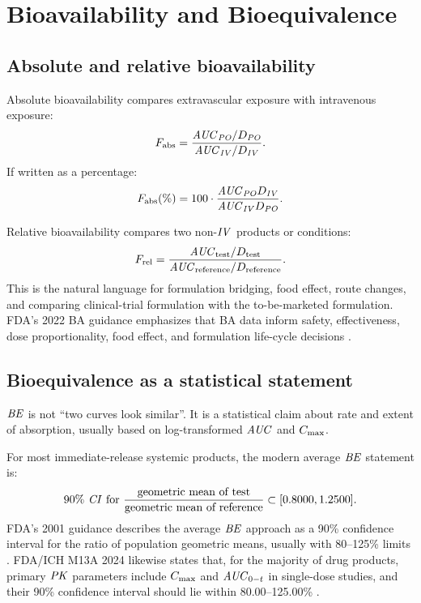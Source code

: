 \documentclass[a4paper]{article}
\newcommand{\AUC}{\ensuremath{\pksym{AUC}}}
\newcommand{\Cmax}{\ensuremath{C_{\pklab{max}}}}
\newcommand{\PK}{\ensuremath{\pksym{PK}}}
\newcommand{\BE}{\ensuremath{\pksym{BE}}}
\newcommand{\IV}{\ensuremath{\pksym{IV}}}
\newcommand{\PO}{\ensuremath{\pksym{PO}}}
\newcommand{\CI}{\ensuremath{\pksym{CI}}}
\begin{document}
\section{Bioavailability and Bioequivalence}

\subsection{Absolute and relative bioavailability}

Absolute bioavailability compares extravascular exposure with intravenous exposure:
\[
  F_{\pklab{abs}}
  =
  \frac{\AUC_{\PO}/D_{\PO}}{\AUC_{\IV}/D_{\IV}}.
\]
If written as a percentage:
\[
  F_{\pklab{abs}}(\%)
  =
  100\cdot
  \frac{\AUC_{\PO}D_{\IV}}{\AUC_{\IV}D_{\PO}}.
\]

Relative bioavailability compares two non-\IV{} products or conditions:
\[
  F_{\pklab{rel}}
  =
  \frac{\AUC_{\pklab{test}}/D_{\pklab{test}}}
       {\AUC_{\pklab{reference}}/D_{\pklab{reference}}}.
\]
This is the natural language for formulation bridging, food effect, route changes, and comparing clinical-trial formulation with the to-be-marketed formulation. FDA's 2022 BA guidance emphasizes that BA data inform safety, effectiveness, dose proportionality, food effect, and formulation life-cycle decisions \cite{fda2022Bioavailability}.

\subsection{Bioequivalence as a statistical statement}

\BE{} is not ``two curves look similar''. It is a statistical claim about rate and extent of absorption, usually based on log-transformed \AUC{} and \Cmax{}.

For most immediate-release systemic products, the modern average \BE{} statement is:
\[
  90\%\ \CI\ \text{for}\ 
  \frac{\text{geometric mean of test}}{\text{geometric mean of reference}}
  \subset [0.8000,1.2500].
\]
FDA's 2001 guidance describes the average \BE{} approach as a 90\% confidence interval for the ratio of population geometric means, usually with 80--125\% limits \cite{fda2001StatisticalBioequivalence}. FDA/ICH M13A 2024 likewise states that, for the majority of drug products, primary \PK{} parameters include \Cmax{} and \(\pksym{AUC}_{0-t}\) in single-dose studies, and their 90\% confidence interval should lie within 80.00--125.00\% \cite{ichM13A2024Bioequivalence}.
\end{document}
